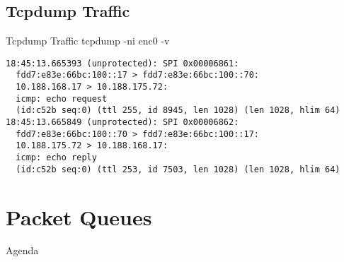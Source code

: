 \documentclass[14pt]{beamer}
\begin{document}
\subsection{Tcpdump Traffic}
\begin{frame}[fragile]{Tcpdump Traffic}
tcpdump -ni enc0 -v
\scriptsize
\begin{verbatim}
18:45:13.665393 (unprotected): SPI 0x00006861:
  fdd7:e83e:66bc:100::17 > fdd7:e83e:66bc:100::70:
  10.188.168.17 > 10.188.175.72:
  icmp: echo request
  (id:c52b seq:0) (ttl 255, id 8945, len 1028) (len 1028, hlim 64)
18:45:13.665849 (unprotected): SPI 0x00006862:
  fdd7:e83e:66bc:100::70 > fdd7:e83e:66bc:100::17:
  10.188.175.72 > 10.188.168.17:
  icmp: echo reply
  (id:c52b seq:0) (ttl 253, id 7503, len 1028) (len 1028, hlim 64)
\end{verbatim}
\end{frame}

\section{Packet Queues}
\begin{frame}{Agenda}
\tableofcontents[currentsection]
\end{frame}
\end{document}
